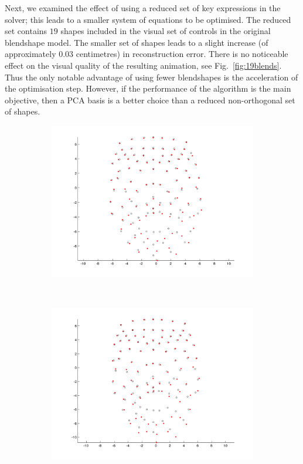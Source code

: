 Next, we examined the effect of using a reduced set of key expressions in the solver; this leads to a smaller system of equations to be optimised. The reduced set contains $19$ shapes included in the visual set of controls in the original blendshape model. The smaller set of shapes leads to a slight increase (of approximately $0.03$ centimetres) in reconstruction error. There is no noticeable effect on the visual quality of the resulting animation, see Fig.~\ref{fig:19blends}. Thus the only notable advantage of using fewer blendshapes is the acceleration of the  optimisation step. However, if the performance of the algorithm is the main objective, then a PCA basis is a better choice than a reduced non-orthogonal set of shapes.

\begin{figure}[htbp!]
        \centering
        \begin{subfigure}[b]{0.3\textwidth}
                \includegraphics[trim = 10mm 0mm 10mm 0mm,clip,width=\textwidth]{img/weights/3D/19blends/w2_frame200_blends19.png}
        \end{subfigure}%
        ~ %
        \begin{subfigure}[b]{0.3\textwidth}
                \includegraphics[trim = 10mm 0mm 10mm 0mm,clip,width=\textwidth]{img/weights/3D/19blends/w2_frame400_blends19.png}

\end{subfigure}
\end{figure}
